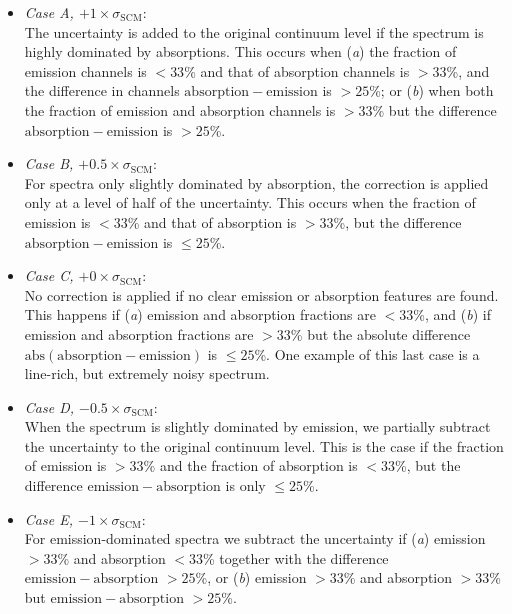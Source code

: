 \documentclass{aa}
\begin{document}
\begin{itemize}
\item \textit{Case A, $+1\times\sigma_\mathrm{SCM}$}: \\
The uncertainty is added to the original continuum level if the spectrum is highly dominated by absorptions. This occurs when (\textit{a}) the fraction of emission channels is $<33$\% and that of absorption channels is $>33$\%, and the difference in channels $\mathrm{absorption}-\mathrm{emission}$ is $>25$\%; or (\textit{b}) when both the fraction of emission and absorption channels is $>33$\% but the difference $\mathrm{absorption}-\mathrm{emission}$ is $>25$\%.
%
\item \textit{Case B, $+0.5\times\sigma_\mathrm{SCM}$}: \\
For spectra only slightly dominated by absorption, the correction is applied only at a level of half of the uncertainty. This occurs when the fraction of emission is $<33$\% and that of absorption is $>33$\%, but the difference $\mathrm{absorption}-\mathrm{emission}$ is $\le25$\%.
%
\item \textit{Case C, $+0\times\sigma_\mathrm{SCM}$}: \\
No correction is applied if no clear emission or absorption features are found. This happens if (\textit{a}) emission and absorption fractions are $<33$\%, and (\textit{b}) if emission and absorption fractions are $>33$\% but the absolute difference $\mathrm{abs}(\mathrm{absorption}-\mathrm{emission})$ is $\le25$\%. One example of this last case is a line-rich, but extremely noisy spectrum.
%
\item \textit{Case D, $-0.5\times\sigma_\mathrm{SCM}$}: \\
When the spectrum is slightly dominated by emission, we partially subtract the uncertainty to the original continuum level. This is the case if the fraction of emission is $>33$\% and the fraction of absorption is $<33$\%, but the difference $\mathrm{emission}-\mathrm{absorption}$ is only $\le25$\%.
%
\item \textit{Case E, $-1\times\sigma_\mathrm{SCM}$}: \\
For emission-dominated spectra we subtract the uncertainty if (\textit{a}) emission $>33$\% and absorption $<33$\% together with the difference $\mathrm{emission}-\mathrm{absorption}$ $>25$\%, or (\textit{b}) emission $>33$\% and absorption $>33$\% but $\mathrm{emission}-\mathrm{absorption}$ $>25$\%.
\end{itemize}
\end{document}
